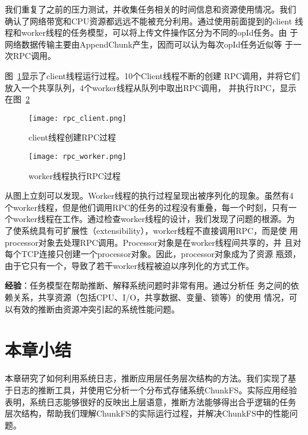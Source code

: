 我们重复了之前的压力测试，并收集任务相关的时间信息和资源使用情况。我们
确认了网络带宽和CPU资源都远远不能被充分利用。通过使用前面提到的client
线程和worker线程的任务模型，可以将上传文件操作区分为不同的opId任务。由
于网络数据传输主要由Append\-Chunk产生，因而可以认为每次opId任务近似等
于一次RPC调用。


图~\ref{fig:rpc_client}显示了client线程运行过程。10个Client线程不断的创建
RPC调用，并将它们放入一个共享队列，4个worker线程从队列中取出RPC调用，
并执行RPC，显示在图~\ref{fig:rpc_worker}
 
\begin{figure}[htbp]
  \centering
  \begin{minipage}{0.8\linewidth}
    \centering
    \texttt{[image: rpc\_client.png]}
    \caption{client线程创建RPC过程}
    \label{fig:rpc_client}
  \end{minipage}
\end{figure}

\begin{figure}[htbp]
  \centering
  \begin{minipage}{0.8\linewidth}
    \centering
    \texttt{[image: rpc\_worker.png]}
    \caption{worker线程执行RPC过程}
    \label{fig:rpc_worker}
  \end{minipage}
\end{figure}

从图上立刻可以发现。Worker线程的执行过程呈现出被序列化的现象。虽然有4
个worker线程，但是他们调用RPC的任务的过程没有重叠，每一个时刻，只有一
个worker线程在工作。通过检查worker线程的设计，我们发现了问题的根源。为
了使系统具有可扩展性（extensibility），worker线程不直接调用RPC，而是使
用processor对象去处理RPC调用。Processor对象是在worker线程间共享的，并
且对每个TCP连接只创建一个processor对象。因此，processor对象成为了资源
瓶颈，由于它只有一个，导致了若干worker线程被迫以序列化的方式工作。

\textbf{经验}：任务模型在帮助推断、解释系统问题时非常有用。通过分析任
务之间的依赖关系，共享资源（包括CPU、I/O，共享数据、变量、锁等）的使用
情况，可以有效的推断由资源冲突引起的系统性能问题。

\section{本章小结}
\label{lm_conclusion}

本章研究了如何利用系统日志，推断应用层任务层次结构的方法。我们实现了基
于日志的推断工具，并使用它分析一个分布式存储系统ChunkFS。实际应用经验
表明，系统日志能够很好的反映出上层语意，推断方法能够得出合乎逻辑的任务
层次结构，帮助我们理解ChunkFS的实际运行过程，并解决ChunkFS中的性能问题。
